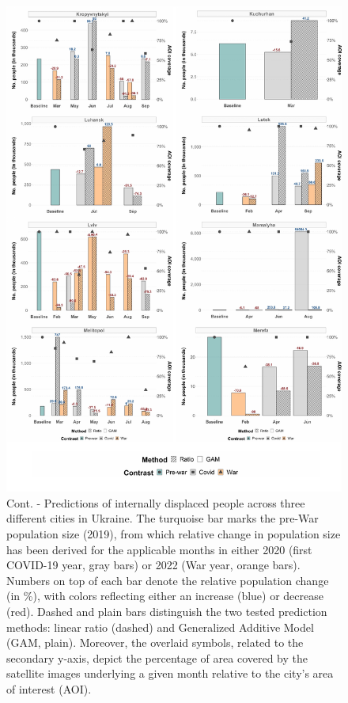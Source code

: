 \documentclass[sn-basic]{sn-jnl}%
\begin{document}
{\begin{appendices}
\begin{figure}[h!]
\begin{center}
\includegraphics[scale = 0.6]{Figures/SM_IDP_pred_Fig3.pdf}
\end{center}
\caption{Cont. - Predictions of internally displaced people across three different cities in Ukraine. The turquoise bar marks the pre-War population size (2019), from which relative change in population size has been derived for the applicable months in either 2020 (first COVID-19 year, gray bars) or 2022 (War year, orange bars). Numbers on top of each bar denote the relative population change (in \%), with colors reflecting either an increase (blue) or decrease (red). Dashed and plain bars distinguish the two tested prediction methods: linear ratio (dashed) and Generalized Additive Model (GAM, plain). Moreover, the overlaid symbols, related to the secondary y-axis, depict the percentage of area covered by the satellite images underlying a given month relative to the city's area of interest (AOI).}
\label{figSM_IDP_pred_Fig3}
\end{figure}



\end{appendices}}
\end{document}
